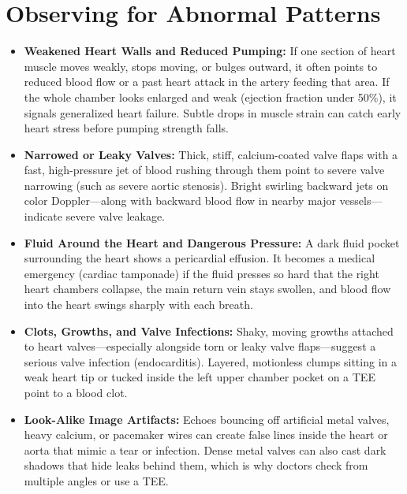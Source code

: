 \section{Observing for Abnormal Patterns}
\begin{itemize}
\item \textbf{Weakened Heart Walls and Reduced Pumping:} If one section of heart muscle moves weakly, stops moving, or bulges outward, it often points to reduced blood flow or a past heart attack in the artery feeding that area. If the whole chamber looks enlarged and weak (ejection fraction under 50\%), it signals generalized heart failure. Subtle drops in muscle strain can catch early heart stress before pumping strength falls.
\item \textbf{Narrowed or Leaky Valves:} Thick, stiff, calcium-coated valve flaps with a fast, high-pressure jet of blood rushing through them point to severe valve narrowing (such as severe aortic stenosis). Bright swirling backward jets on color Doppler---along with backward blood flow in nearby major vessels---indicate severe valve leakage.
\item \textbf{Fluid Around the Heart and Dangerous Pressure:} A dark fluid pocket surrounding the heart shows a pericardial effusion. It becomes a medical emergency (cardiac tamponade) if the fluid presses so hard that the right heart chambers collapse, the main return vein stays swollen, and blood flow into the heart swings sharply with each breath.
\item \textbf{Clots, Growths, and Valve Infections:} Shaky, moving growths attached to heart valves---especially alongside torn or leaky valve flaps---suggest a serious valve infection (endocarditis). Layered, motionless clumps sitting in a weak heart tip or tucked inside the left upper chamber pocket on a TEE point to a blood clot.
\item \textbf{Look-Alike Image Artifacts:} Echoes bouncing off artificial metal valves, heavy calcium, or pacemaker wires can create false lines inside the heart or aorta that mimic a tear or infection. Dense metal valves can also cast dark shadows that hide leaks behind them, which is why doctors check from multiple angles or use a TEE.
\end{itemize}


